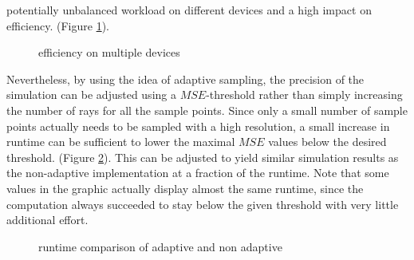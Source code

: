 potentially unbalanced workload on different devices and a high impact on efficiency.
(Figure \ref{plot:gpu_scaling}).
\begin{figure}[H]
  \centerline{
    }
  \caption{efficiency on multiple devices}
  \label{plot:gpu_scaling}
\end{figure}
Nevertheless, by using the idea of adaptive sampling, the precision of the
simulation can be adjusted using a $MSE$-threshold rather than simply increasing
the number of rays for all the sample points. Since only a small number of
sample points actually needs to be sampled with a high resolution, a small
increase in runtime can be sufficient to lower the maximal $MSE$ values below
the desired threshold. (Figure \ref{plot:adaptive_runtime}). This can be
adjusted to yield similar simulation results as the non-adaptive implementation
at a fraction of the runtime. Note that some values in the graphic actually
display almost the same runtime, since the computation always succeeded to stay
below the given threshold with very little additional effort.
\begin{figure}[H]
  \centerline{
    }
  \caption{runtime comparison of adaptive and non adaptive }
  \label{plot:adaptive_runtime}
\end{figure}
